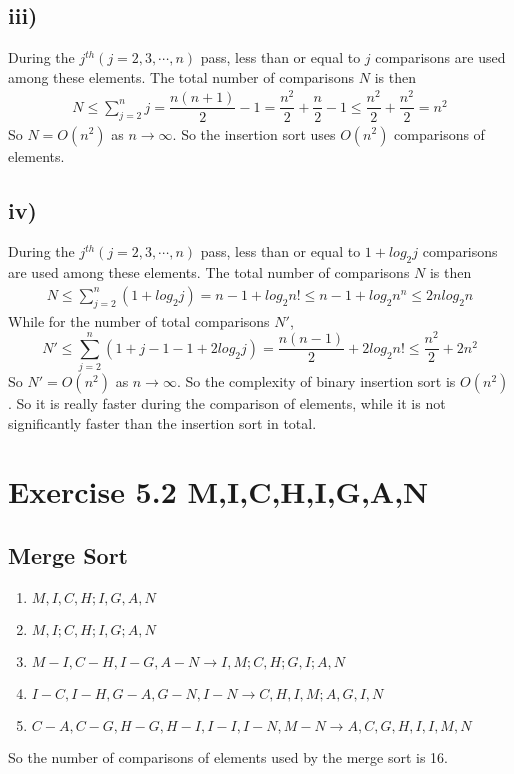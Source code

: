 \documentclass[a4paper,12pt,titlepage]{article}
\begin{document}
\subsection*{iii)}
During the $j^{th}(j=2,3,\cdots,n)$ pass, less than or equal to $j$ comparisons are used among these elements. The total number of comparisons $N$ is then
\begin{align*}
N\leqslant\sum\limits_{j=2}^nj=\dfrac{n(n+1)}{2}-1=\dfrac{n^2}{2}+\dfrac{n}{2}-1\leqslant \dfrac{n^2}{2}+\dfrac{n^2}{2}=n^2
\end{align*}
So $N=O(n^2)$ as $n\rightarrow\infty$. So the insertion sort uses $O(n^2)$ comparisons of elements.

\subsection*{iv)}
During the $j^{th}(j=2,3,\cdots,n)$ pass, less than or equal to $1+log_2j$ comparisons are used among these elements. The total number of comparisons $N$ is then
\begin{align*}
N\leqslant\sum\limits_{j=2}^n(1+log_2j)=n-1+log_2n!\leqslant n-1+log_2n^n\leqslant 2nlog_2n
\end{align*}
While for the number of total comparisons $N'$,
$$N'\leqslant\sum\limits_{j=2}^n(1+j-1-1+2log_2j)=\dfrac{n(n-1)}{2}+2log_2n!\leqslant \dfrac{n^2}{2}+2n^2$$ 
So $N'=O(n^2)$ as $n\rightarrow\infty$. So the complexity of binary insertion sort is $O(n^2)$. So it is really faster during the comparison of elements, while it is not significantly faster than the insertion sort in total.

\section*{Exercise 5.2 M,I,C,H,I,G,A,N}
\subsection*{Merge Sort}

\begin{enumerate}
\item $M,I,C,H;I,G,A,N$
\item $M,I;C,H;I,G;A,N$
\item $M-I,C-H,I-G,A-N\rightarrow I,M;C,H;G,I;A,N$
\item $I-C,I-H,G-A,G-N,I-N\rightarrow C,H,I,M;A,G,I,N$
\item $C-A,C-G,H-G,H-I,I-I,I-N,M-N\rightarrow A,C,G,H,I,I,M,N$
\end{enumerate}
So the number of comparisons of elements used by the merge sort is 16.
\end{document}
